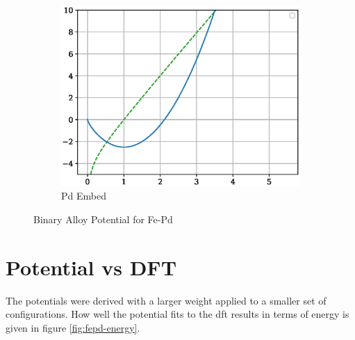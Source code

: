 \begin{figure}[htb]
\begin{subfigure}{.32\textwidth}
  \includegraphics[width=.94\linewidth]{chapters/potentials_fe_pd_ru/fepd_potential/function_plots/pd_embe.eps}  
  \caption{Pd Embed}
  \label{fig:fepd-pd-embe}
\end{subfigure}
\label{fig:fepd-fcc-function-plots}
\caption{Binary Alloy Potential for Fe-Pd}
\end{figure}









\clearpage
\section{Potential vs DFT}

The potentials were derived with a larger weight applied to a smaller set of configurations.  How well the potential fits to the \acrshort{dft} results in terms of energy is given in figure \ref{fig:fepd-energy}.

